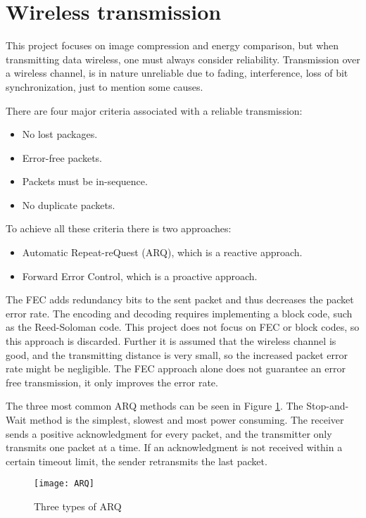 \section{Wireless transmission}\label{sec:wireless}
This project focuses on image compression and energy comparison, but when transmitting data wireless, one must always consider reliability.
Transmission over a wireless channel, is in nature unreliable due to fading, interference, loss of bit synchronization, just to mention some causes.

There are four major criteria associated with a reliable transmission:
\begin{itemize}
\item No lost packages.
\item Error-free packets.
\item Packets must be in-sequence.
\item No duplicate packets.
\end{itemize}
To achieve all these criteria there is two approaches:
\begin{itemize}
\item Automatic Repeat-reQuest (ARQ), which is a reactive approach.
\item Forward Error Control, which is a proactive approach. 
\end{itemize}

The FEC adds redundancy bits to the sent packet and thus decreases the packet error rate.
The encoding and decoding requires implementing a block code, such as the Reed-Soloman code.
This project does not focus on FEC or block codes, so this approach is discarded.
Further it is assumed that the wireless channel is good, and the transmitting distance is very small, so the increased packet error rate might be negligible.
The FEC approach alone does not guarantee an error free transmission, it only improves the error rate.

The three most common ARQ methods can be seen in Figure \ref{fig:ARQ}. The Stop-and-Wait method is the simplest, slowest and most power consuming. The receiver sends a positive acknowledgment for every packet, and the transmitter only transmits one packet at a time. If an acknowledgment is not received within a certain timeout limit, the sender retransmits the last packet.

\begin{figure}
\centering
\texttt{[image: ARQ]}
\caption{Three types of ARQ}
\label{fig:ARQ}
\end{figure}

